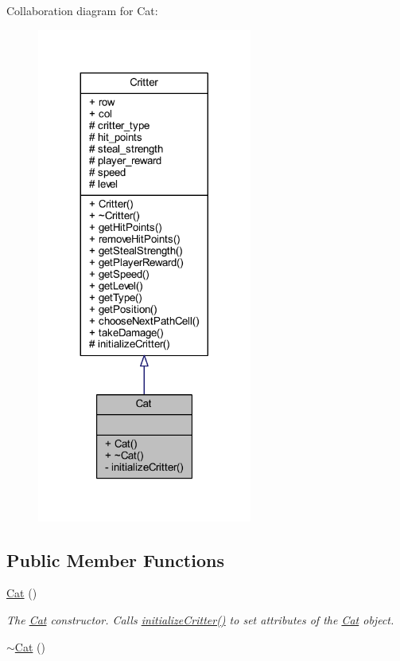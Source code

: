 Collaboration diagram for Cat\+:
\nopagebreak
\begin{figure}[H]
\begin{center}
\leavevmode
\includegraphics[width=200pt]{class_cat__coll__graph}
\end{center}
\end{figure}
\subsection*{Public Member Functions}
\begin{DoxyCompactItemize}
\item 
\hyperlink{class_cat_adff0d67c4d14c4eeeb35b8daa33ee442}{Cat} ()
\begin{DoxyCompactList}\small\item\em The \hyperlink{class_cat}{Cat} constructor. Calls \hyperlink{class_cat_a2bf5faec9a7399c19e6dceb9402a34d7}{initialize\+Critter()} to set attributes of the \hyperlink{class_cat}{Cat} object. \end{DoxyCompactList}\item 
\hyperlink{class_cat_accae87693b84127a716243cbf5e6ddee}{$\sim$\+Cat} ()
\end{DoxyCompactItemize}
